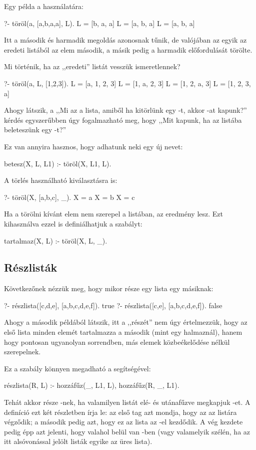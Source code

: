 Egy példa a használatára:
\begin{query}
?- töröl(a, [a,b,a,a], L).
L = [b, a, a]
L = [a, b, a]
L = [a, b, a]
\end{query}
Itt a második és harmadik megoldás azonosnak tűnik,
de valójában az egyik az eredeti listából az 
elem második, a másik pedig a harmadik előfordulását
törölte.

Mi történik, ha az ,,eredeti'' listát vesszük
ismeretlennek?
\begin{query}
?- töröl(a, L, [1,2,3]).
L = [a, 1, 2, 3]
L = [1, a, 2, 3]
L = [1, 2, a, 3]
L = [1, 2, 3, a]
\end{query}
Ahogy látszik, a ,,Mi az a lista, amiből ha
kitörlünk egy -t, akkor \pr{[1,2,3]}-at
kapunk?'' kérdés egyszerűbben úgy fogalmazható meg,
hogy ,,Mit kapunk, ha az \pr{[1, 2, 3]} listába
beleteszünk egy -t?''

Ez van annyira hasznos, hogy adhatunk neki egy új
nevet:
\begin{program}
betesz(X, L, L1) :- töröl(X, L1, L).
\end{program}

A törlés használható kiválasztásra is:
\begin{query}
?- töröl(X, [a,b,c], _).
X = a
X = b
X = c
\end{query}

Ha a törölni kívánt elem nem szerepel a listában, az
eredmény  lesz. Ezt kihasználva ezzel is
definiálhatjuk a  szabályt:
\begin{program}
tartalmaz(X, L) :- töröl(X, L, _).
\end{program}

\subsection*{Részlisták}
Következőnek nézzük meg, hogy mikor része egy lista
egy másiknak:
\begin{query}
?- részlista([c,d,e], [a,b,c,d,e,f]).
true
?- részlista([c,e], [a,b,c,d,e,f]).
false
\end{query}

Ahogy a második példából látszik, itt a ,,részét''
nem úgy értelmezzük, hogy az első lista minden
elemét tartalmazza a második (mint egy halmaznál),
hanem hogy pontosan ugyanolyan sorrendben, más
elemek közbeékelődése nélkül szerepelnek.

Ez a szabály könnyen megadható a 
segítségével:
\begin{program}
részlista(R, L) :-
    hozzáfűz(_, L1, L), hozzáfűz(R, _, L1).
\end{program}
Tehát  akkor része -nek, ha valamilyen
listát elé- és utánafűzve megkapjuk -et. A
definíció ezt két részletben írja le: az első tag
azt mondja, hogy az  az  listára
végződik; a második pedig azt, hogy ez az 
lista az -el kezdődik. A vég kezdete pedig épp
azt jelenti, hogy  valahol belül van
-ben (vagy valamelyik szélén, ha az itt
alsóvonással jelölt listák egyike az üres lista).

